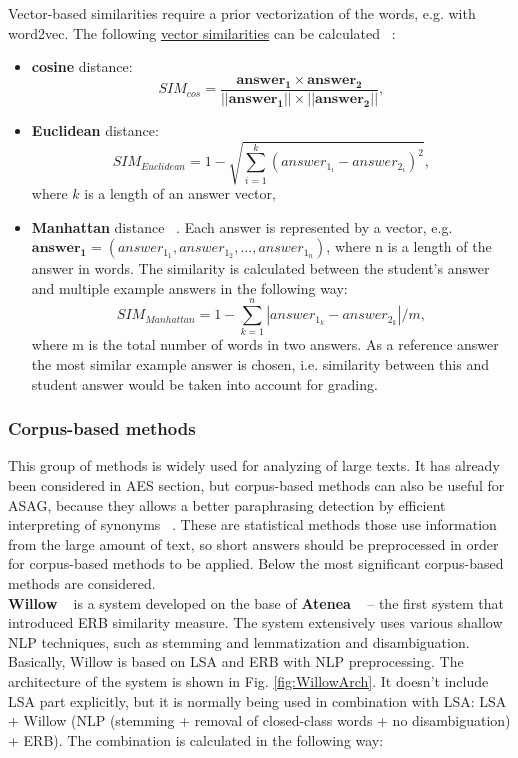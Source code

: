 Vector-based similarities require a prior vectorization of the words, e.g. with word2vec. The following \underline{vector similarities} can be calculated ~\cite{Klein}:

\begin{itemize}
\item \textbf{cosine} distance:
\begin{equation} \label{eq:cos}
SIM_{cos} = \frac{\pmb{answer_1} \times \pmb{answer_2}}{||\pmb{answer_1}|| \times ||\pmb{answer_2}||},
\end{equation}
\item \textbf{Euclidean} distance:
\begin{equation} \label{eq:Euclidean}
SIM_{Euclidean} = 1 - \sqrt{\sum^k_{i=1}(answer_{1_i} - answer_{2_i})^2},
\end{equation}
where $k$ is a length of an answer vector,
\item \textbf{Manhattan} distance ~\cite{Li}. Each answer is represented by a vector, e.g. $ \pmb{answer_1} = (answer_{1_1}, answer_{1_2},..., answer_{1_n})$, where n is a length of the answer in words. The similarity is calculated between the student's answer and multiple example answers in the following way:
\begin{equation} \label{eq:Manhattan}
SIM_{Manhattan} = 1 - \sum^n_{k=1}|answer_{1_k} - answer_{2_k}| / m,
\end{equation}
where m is the total number of words in two answers. As a reference answer the most similar example answer is chosen, i.e. similarity between this and student answer would be taken into account for grading.
\end{itemize} 


\subsubsection{Corpus-based methods}

This group of methods is widely used for analyzing of large texts. It has already been considered in AES section, but corpus-based methods can also be useful for ASAG, because they allows a better paraphrasing detection by efficient interpreting of synonyms ~\cite{Burrows}. These are statistical methods those use information from the large amount of text, so short answers should be preprocessed in order for corpus-based methods to be applied. Below the most significant corpus-based methods are considered.\\

\textbf{Willow} ~\cite{Willow} is a system developed on the base of \textbf{Atenea} ~\cite{ERB} -- the first system that introduced ERB similarity measure. The system extensively uses various shallow NLP techniques, such as stemming and lemmatization and disambiguation. Basically, Willow is based on LSA and ERB with NLP preprocessing. The architecture of the system is shown in Fig. \ref{fig:WillowArch}. It doesn't include LSA part explicitly, but it is normally being used in combination with LSA: LSA + Willow (NLP (stemming + removal of closed-class words + no disambiguation) + ERB). The combination is calculated in the following way:

